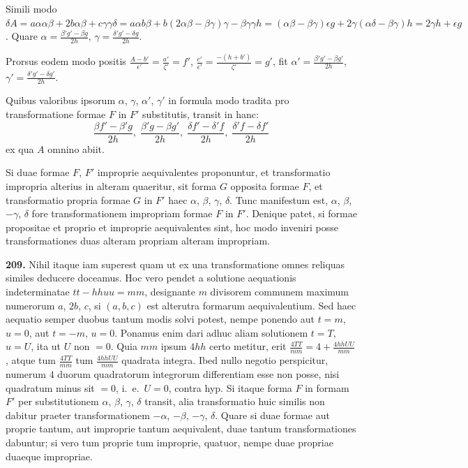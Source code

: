 \documentclass[12pt,a4paper]{article}
\theoremstyle{plain}
\theoremstyle{definition}
\theoremstyle{remark}
\begin{document}
Simili modo $\delta A = a\alpha\alpha\beta+2b\alpha\beta+c\gamma\gamma\delta = a\alpha b\beta+b(2\alpha\beta-\beta\gamma)\gamma-\beta\gamma\gamma h = (\alpha\beta-\beta\gamma)\epsilon g+2\gamma(\alpha\delta-\beta\gamma)h = 2\gamma h+\epsilon g$. Quare $\alpha = \frac{\beta' g'-\beta g}{2h}$, $\gamma = \frac{\delta' g'-\delta g}{2h}$.

Prorsus eodem modo positis $\frac{A-b'}{\epsilon'}=\frac{a'}{\zeta'}=f'$, $\frac{c'}{\epsilon'}=\frac{-(h+b')}{\zeta'}=g'$, fit $\alpha' = \frac{\beta' g'-\beta g'}{2h}$, $\gamma' = \frac{\delta' g'-\delta g'}{2h}$.

Quibus valoribus ipsorum $\alpha$, $\gamma$, $\alpha'$, $\gamma'$ in formula modo tradita pro transformatione formae $F$ in $F'$ substitutis, transit in hanc:
\[
\frac{\beta f'-\beta' g}{2h},\; \frac{\beta' g-\beta g'}{2h},\; \frac{\delta f'-\delta' f}{2h},\; \frac{\delta' f-\delta f'}{2h}
\]
ex qua $A$ omnino abiit.

Si duae formae $F$, $F'$ improprie aequivalentes proponuntur, et transformatio impropria alterius in alteram quaeritur, sit forma $G$ opposita formae $F$, et transformatio propria formae $G$ in $F'$ haec $\alpha$, $\beta$, $\gamma$, $\delta$. Tunc manifestum est, $\alpha$, $\beta$, $-\gamma$, $\delta$ fore transformationem impropriam formae $F$ in $F'$. Denique patet, si formae propositae et proprio et improprie aequivalentes sint, hoc modo inveniri posse transformationes duas alteram propriam alteram impropriam.

\textbf{209.}
Nihil itaque iam superest quam ut ex una transformatione omnes reliquas similes deducere doceamus. Hoc vero pendet a solutione aequationis indeterminatae $tt-hhuu=mm$, designante $m$ divisorem communem maximum numerorum $a$, $2b$, $c$, si $(a,b,c)$ est alterutra formarum aequivalentium. Sed haec aequatio semper duobus tantum modis solvi potest, nempe ponendo aut $t=m$, $u=0$, aut $t=-m$, $u=0$. Ponamus enim dari adhuc aliam solutionem $t=T$, $u=U$, ita ut $U$ non $=0$. Quia $mm$ ipsum $4hh$ certo metitur, erit $\frac{4TT}{mm} = 4+\frac{4hhUU}{mm}$, atque tum $\frac{4TT}{mm}$ tum $\frac{4hhUU}{mm}$ quadrata integra. Ibed nullo negotio perspicitur, numerum $4$ duorum quadratorum integrorum differentiam esse non posse, nisi quadratum minus sit $=0$, i.\ e.\ $U=0$, contra hyp. Si itaque forma $F$ in formam $F'$ per substitutionem $\alpha$, $\beta$, $\gamma$, $\delta$ transit, alia transformatio huic similis non dabitur praeter transformationem $-\alpha$, $-\beta$, $-\gamma$, $\delta$. Quare si duae formae aut proprie tantum, aut improprie tantum aequivalent, duae tantum transformationes dabuntur; si vero tum proprie tum improprie, quatuor, nempe duae propriae duaeque impropriae.
\end{document}
